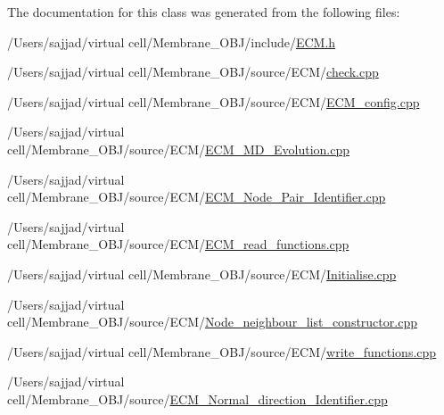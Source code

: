 The documentation for this class was generated from the following files\+:\begin{DoxyCompactItemize}
\item 
/\+Users/sajjad/virtual cell/\+Membrane\+\_\+\+O\+B\+J/include/\mbox{\hyperlink{ECM_8h}{E\+C\+M.\+h}}\item 
/\+Users/sajjad/virtual cell/\+Membrane\+\_\+\+O\+B\+J/source/\+E\+C\+M/\mbox{\hyperlink{ECM_2check_8cpp}{check.\+cpp}}\item 
/\+Users/sajjad/virtual cell/\+Membrane\+\_\+\+O\+B\+J/source/\+E\+C\+M/\mbox{\hyperlink{ECM__config_8cpp}{E\+C\+M\+\_\+config.\+cpp}}\item 
/\+Users/sajjad/virtual cell/\+Membrane\+\_\+\+O\+B\+J/source/\+E\+C\+M/\mbox{\hyperlink{ECM__MD__Evolution_8cpp}{E\+C\+M\+\_\+\+M\+D\+\_\+\+Evolution.\+cpp}}\item 
/\+Users/sajjad/virtual cell/\+Membrane\+\_\+\+O\+B\+J/source/\+E\+C\+M/\mbox{\hyperlink{ECM__Node__Pair__Identifier_8cpp}{E\+C\+M\+\_\+\+Node\+\_\+\+Pair\+\_\+\+Identifier.\+cpp}}\item 
/\+Users/sajjad/virtual cell/\+Membrane\+\_\+\+O\+B\+J/source/\+E\+C\+M/\mbox{\hyperlink{ECM__read__functions_8cpp}{E\+C\+M\+\_\+read\+\_\+functions.\+cpp}}\item 
/\+Users/sajjad/virtual cell/\+Membrane\+\_\+\+O\+B\+J/source/\+E\+C\+M/\mbox{\hyperlink{ECM_2Initialise_8cpp}{Initialise.\+cpp}}\item 
/\+Users/sajjad/virtual cell/\+Membrane\+\_\+\+O\+B\+J/source/\+E\+C\+M/\mbox{\hyperlink{Node__neighbour__list__constructor_8cpp}{Node\+\_\+neighbour\+\_\+list\+\_\+constructor.\+cpp}}\item 
/\+Users/sajjad/virtual cell/\+Membrane\+\_\+\+O\+B\+J/source/\+E\+C\+M/\mbox{\hyperlink{ECM_2write__functions_8cpp}{write\+\_\+functions.\+cpp}}\item 
/\+Users/sajjad/virtual cell/\+Membrane\+\_\+\+O\+B\+J/source/\mbox{\hyperlink{ECM__Normal__direction__Identifier_8cpp}{E\+C\+M\+\_\+\+Normal\+\_\+direction\+\_\+\+Identifier.\+cpp}}\end{DoxyCompactItemize}
